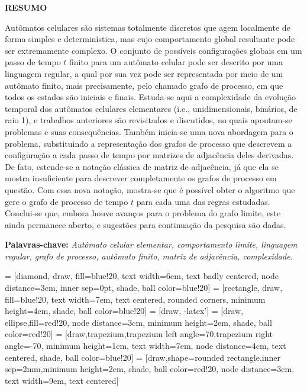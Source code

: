 \documentclass[12pt,a4paper]{article}
\begin{document}
\newpage
\thispagestyle{plain}
\begin{center}
\large
\textbf{RESUMO}
\end{center}
\renewcommand{\baselinestretch}{0.6666666}
Autômatos celulares são sistemas totalmente discretos que agem
localmente de forma simples e determinística, mas cujo comportamento
global resultante pode ser extremamente complexo. O conjunto de possíveis
configurações globais em um passo de tempo $t$ finito para um autômato celular pode ser
descrito por uma linguagem regular, a qual por sua vez pode ser representada
por meio de um autômato finito, mais precisamente, pelo chamado grafo de
processo, em que todos os estados são iniciais e finais.
Estuda-se aqui a complexidade da evolução temporal dos autômatos celulares
elementares (i.e., unidimensionais, binários, de raio 1),
e trabalhos anteriores são revisitados e discutidos, no quais apontam-se
problemas e suas consequências. Também inicia-se
uma nova abordagem para o problema, substituindo a representação dos
grafos de processo que descrevem a configuração a cada passo de tempo
por matrizes de adjacência deles derivadas. De fato, estende-se a notação
clássica de matriz de adjacência, já que ela se mostra insuficiente para
descrever completamente os grafos de processo em questão. Com essa nova
notação, mostra-se que é possível obter o algoritmo que gere o grafo de
processo de tempo $t$ para cada uma das regras estudadas. Conclui-se que,
embora houve avanços para o problema do grafo limite, este ainda permanece
aberto, e sugestões para continuação da pesquisa são dadas.
\\[0.5cm]
\begin{flushleft}
{\bf Palavras-chave:} {\it Autômato celular elementar, comportamento limite,
linguagem regular, grafo de processo, autômato finito, matriz de adjacência,
complexidade.}
\end{flushleft}

\newpage
\thispagestyle{empty}
\tableofcontents

\newpage
\thispagestyle{empty}
\listoffigures

\newpage
\thispagestyle{empty}
\listoftables

 = [diamond, draw, fill=blue!20, 
    text width=6em, text badly centered, node distance=3cm, inner sep=0pt, shade, ball color=blue!20]
 = [rectangle, draw, fill=blue!20, 
    text width=7em, text centered, rounded corners, minimum height=4em, shade, ball color=blue!20]
 = [draw, -latex']
 = [draw, ellipse,fill=red!20, node distance=3cm,
    minimum height=2em, shade, ball color=red!20]
 = [draw,trapezium,trapezium left angle=70,trapezium right angle=-70,
                        minimum height=1cm, text width=7em, node distance=4cm, text centered, shade, ball color=blue!20]
 = [draw,shape=rounded rectangle,inner sep=2mm,minimum height=2em, shade,
                        ball color=red!20, node distance=3cm, text width=9em, text centered]
    
\end{document}
